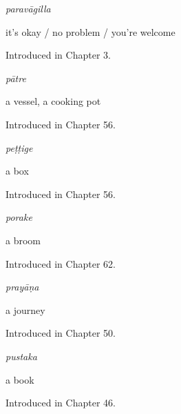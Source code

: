 \noindent\begin{minipage}[t]{\linewidth}
\raggedright
\textbf{}\enspace\emph{paravāgilla}\par
\small it's okay / no problem / you're welcome\par
\footnotesize Introduced in Chapter 3.
\end{minipage}\par\medskip

\noindent\begin{minipage}[t]{\linewidth}
\raggedright
\textbf{}\enspace\emph{pātre}\par
\small a vessel, a cooking pot\par
\footnotesize Introduced in Chapter 56.
\end{minipage}\par\medskip

\noindent\begin{minipage}[t]{\linewidth}
\raggedright
\textbf{}\enspace\emph{peṭṭige}\par
\small a box\par
\footnotesize Introduced in Chapter 56.
\end{minipage}\par\medskip

\noindent\begin{minipage}[t]{\linewidth}
\raggedright
\textbf{}\enspace\emph{porake}\par
\small a broom\par
\footnotesize Introduced in Chapter 62.
\end{minipage}\par\medskip

\noindent\begin{minipage}[t]{\linewidth}
\raggedright
\textbf{}\enspace\emph{prayāṇa}\par
\small a journey\par
\footnotesize Introduced in Chapter 50.
\end{minipage}\par\medskip

\noindent\begin{minipage}[t]{\linewidth}
\raggedright
\textbf{}\enspace\emph{pustaka}\par
\small a book\par
\footnotesize Introduced in Chapter 46.
\end{minipage}\par\medskip

